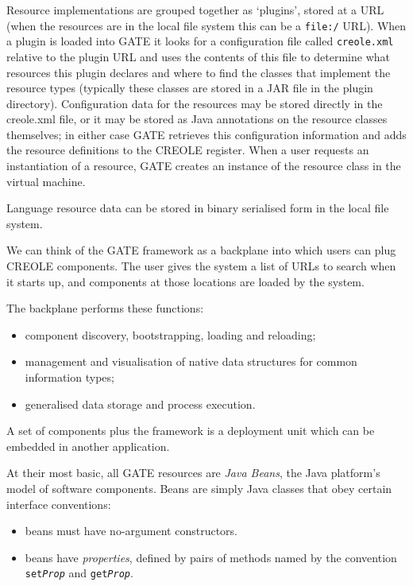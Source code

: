 Resource implementations are grouped together as `plugins', stored
at a URL (when the resources are in the local file system this can be
a {\tt file:/} URL). When a plugin is loaded into GATE it looks for a
configuration file called {\tt creole.xml} relative to the plugin URL
and uses the contents of this file to determine what resources this
plugin declares and where to find the classes that implement the
resource types (typically these classes are stored in a JAR file in
the plugin directory).  Configuration data for the resources may be
stored directly in the creole.xml file, or it may be stored as Java
annotations on the resource classes themselves; in either case GATE
retrieves this configuration information and adds the resource
definitions to the CREOLE register. When a user requests an
instantiation of a resource, GATE creates an instance of the resource
class in the virtual machine.

Language resource data can be stored in binary serialised form in the local
file system.


\label{sec:creole-model:beans}

We can think of the GATE framework as a backplane into
which users can plug CREOLE components.
The user gives the system a list of URLs to search when it starts up,
and components at those locations are loaded by the system.

The backplane performs these functions:
\begin{itemize}
\item
component discovery, bootstrapping, loading and reloading;
\item
management and visualisation of
native data structures for common information types;
\item
generalised data storage and process execution.
\end{itemize}

A set of components plus the framework is a deployment unit which can be
embedded in another application.

At their most basic, all GATE resources are {\em Java Beans}, the Java
platform's model of software components. Beans are simply Java classes that
obey certain interface conventions:
\begin{itemize}
\item
beans must have no-argument constructors.
%
\item
beans have \emph{properties}, defined by pairs of methods named by the
convention \texttt{set\emph{Prop}} and \texttt{get\emph{Prop}}.
\end{itemize}
%


